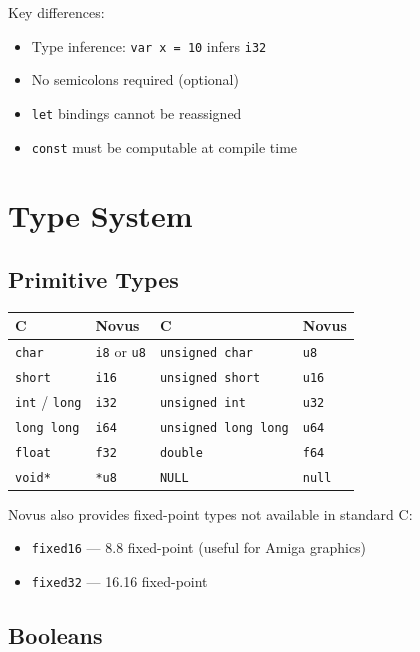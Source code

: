 Key differences:
\begin{itemize}
    \item Type inference: \texttt{var x = 10} infers \texttt{i32}
    \item No semicolons required (optional)
    \item \texttt{let} bindings cannot be reassigned
    \item \texttt{const} must be computable at compile time
\end{itemize}

\section{Type System}

\subsection{Primitive Types}

\begin{center}
\begin{tabular}{ll|ll}
\textbf{C} & \textbf{Novus} & \textbf{C} & \textbf{Novus} \\
\hline
\texttt{char} & \texttt{i8} or \texttt{u8} & \texttt{unsigned char} & \texttt{u8} \\
\texttt{short} & \texttt{i16} & \texttt{unsigned short} & \texttt{u16} \\
\texttt{int} / \texttt{long} & \texttt{i32} & \texttt{unsigned int} & \texttt{u32} \\
\texttt{long long} & \texttt{i64} & \texttt{unsigned long long} & \texttt{u64} \\
\texttt{float} & \texttt{f32} & \texttt{double} & \texttt{f64} \\
\texttt{void*} & \texttt{*u8} & \texttt{NULL} & \texttt{null} \\
\end{tabular}
\end{center}

Novus also provides fixed-point types not available in standard C:
\begin{itemize}
    \item \texttt{fixed16} --- 8.8 fixed-point (useful for Amiga graphics)
    \item \texttt{fixed32} --- 16.16 fixed-point
\end{itemize}

\subsection{Booleans}


